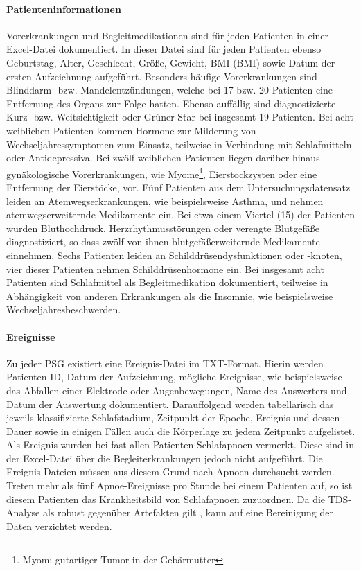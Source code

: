 \paragraph{Patienteninformationen} Vorerkrankungen und Begleitmedikationen sind für jeden Patienten in einer Excel-Datei dokumentiert. In dieser Datei sind für jeden Patienten ebenso Geburtstag, Alter, Geschlecht, Größe, Gewicht, \acl{BMI} (\acs{BMI}) sowie Datum der ersten Aufzeichnung aufgeführt. Besonders häufige Vorerkrankungen sind Blinddarm- bzw. Mandelentzündungen, welche bei 17 bzw. 20 Patienten eine Entfernung des Organs zur Folge hatten. Ebenso auffällig sind diagnostizierte Kurz- bzw. Weitsichtigkeit oder Grüner Star bei insgesamt 19 Patienten. Bei acht weiblichen Patienten kommen Hormone zur Milderung von Wechseljahressymptomen zum Einsatz, teilweise in Verbindung mit Schlafmitteln oder Antidepressiva. Bei zwölf weiblichen Patienten liegen darüber hinaus gynäkologische Vorerkrankungen, wie Myome\footnote{Myom: gutartiger Tumor in der Gebärmutter}, Eierstockzysten oder eine Entfernung der Eierstöcke, vor. Fünf Patienten aus dem Untersuchungsdatensatz leiden an Atemwegserkrankungen, wie beispielsweise Asthma, und nehmen atemwegserweiternde Medikamente ein. Bei etwa einem Viertel (15) der Patienten wurden Bluthochdruck, Herzrhythmusstörungen oder verengte Blutgefäße diagnostiziert, so dass zwölf von ihnen blutgefäßerweiternde Medikamente einnehmen. Sechs Patienten leiden an Schilddrüsendysfunktionen oder -knoten, vier dieser Patienten nehmen Schilddrüsenhormone ein. Bei insgesamt acht Patienten sind Schlafmittel als Begleitmedikation dokumentiert, teilweise in Abhängigkeit von anderen Erkrankungen als die Insomnie, wie beispielsweise Wechseljahresbeschwerden.

\paragraph{Ereignisse} Zu jeder \acs{PSG} existiert eine Ereignis-Datei im TXT-Format. Hierin werden Patienten-ID, Datum der Aufzeichnung, mögliche Ereignisse, wie beispielsweise das Abfallen einer Elektrode oder Augenbewegungen, Name des Auswerters und Datum der Auswertung dokumentiert. Darauffolgend werden tabellarisch das jeweils klassifizierte Schlafstadium, Zeitpunkt der Epoche, Ereignis und dessen Dauer sowie in einigen Fällen auch die Körperlage zu jedem Zeitpunkt aufgelistet. Als Ereignis wurden bei fast allen Patienten Schlafapnoen vermerkt. Diese sind in der Excel-Datei über die Begleiterkrankungen jedoch nicht aufgeführt. Die Ereignis-Dateien müssen aus diesem Grund nach Apnoen durchsucht werden. Treten mehr als fünf Apnoe-Ereignisse pro Stunde bei einem Patienten auf, so ist diesem Patienten das Krankheitsbild von Schlafapnoen zuzuordnen. 
Da die \acs{TDS}-Analyse als robust gegenüber Artefakten gilt \parencite{breuer_netzwerktopologie_2016}, kann auf eine Bereinigung der Daten verzichtet werden.

